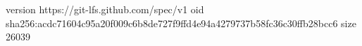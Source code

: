 version https://git-lfs.github.com/spec/v1
oid sha256:acdc71604c95a20f009c6b8de727f9ffd4e94a4279737b58fc36c30ffb28bcc6
size 26039
